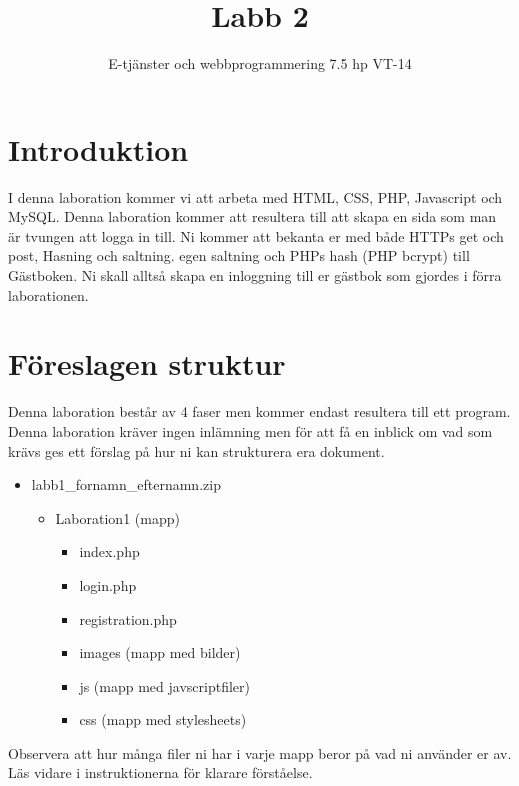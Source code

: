 \documentclass[12pt]{article}
\date{}
\title{ Labb 2 }
\author{ E-tjänster och webbprogrammering 7.5 hp VT-14 }
\begin{document}
\maketitle
\vspace{-2em}



\section{Introduktion}
I denna laboration kommer vi att arbeta med HTML, CSS, PHP, Javascript och MySQL. Denna laboration kommer att resultera till att skapa en sida som man är tvungen att logga in till. Ni kommer att bekanta er med både HTTPs get och post, Hasning och saltning. egen saltning och PHPs hash (PHP bcrypt) till Gästboken. Ni skall alltså skapa en inloggning till er gästbok som gjordes i förra laborationen. 



\section{Föreslagen struktur}
Denna laboration består av 4 faser men kommer endast resultera till ett program. Denna laboration kräver ingen inlämning men för att få en inblick om vad som krävs ges ett förslag på hur ni kan strukturera era dokument.
  \begin{itemize}
    \item labb1\_fornamn\_efternamn.zip
      \begin{itemize}
        \item Laboration1 (mapp)
          \begin{itemize}
            \item index.php 
            \item login.php
	   \item registration.php
            \item images (mapp med bilder)
            \item js (mapp med javscriptfiler)
	   \item css (mapp med stylesheets)
          \end{itemize}
    \end{itemize}
  \end{itemize}

Observera att hur många filer ni har i varje mapp beror på vad ni använder er av. Läs vidare i instruktionerna för klarare förståelse.


\pagebreak
\end{document}
